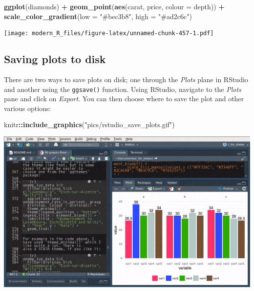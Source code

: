 \documentclass[]{gitbook}
\newenvironment{Shaded}{\begin{snugshade}}{\end{snugshade}}
\newcommand{\DataTypeTok}[1]{\textcolor[rgb]{0.13,0.29,0.53}{#1}}
\newcommand{\KeywordTok}[1]{\textcolor[rgb]{0.13,0.29,0.53}{\textbf{#1}}}
\newcommand{\NormalTok}[1]{#1}
\newcommand{\OperatorTok}[1]{\textcolor[rgb]{0.81,0.36,0.00}{\textbf{#1}}}
\newcommand{\StringTok}[1]{\textcolor[rgb]{0.31,0.60,0.02}{#1}}
\begin{document}
\begin{Shaded}
\begin{Highlighting}[]
\KeywordTok{ggplot}\NormalTok{(diamonds) }\OperatorTok{+}
\StringTok{  }\KeywordTok{geom_point}\NormalTok{(}\KeywordTok{aes}\NormalTok{(carat, price, }\DataTypeTok{colour =}\NormalTok{ depth)) }\OperatorTok{+}
\StringTok{  }\KeywordTok{scale_color_gradient}\NormalTok{(}\DataTypeTok{low =} \StringTok{"#bec3b8"}\NormalTok{, }\DataTypeTok{high =} \StringTok{"#ad2c6c"}\NormalTok{)}
\end{Highlighting}
\end{Shaded}

\texttt{[image: modern\_R\_files/figure-latex/unnamed-chunk-457-1.pdf]}

\hypertarget{saving-plots-to-disk}{%
\subsection{Saving plots to disk}\label{saving-plots-to-disk}}

There are two ways to save plots on disk; one through the \emph{Plots} plane in RStudio and another using the
\texttt{ggsave()} function. Using RStudio, navigate to the \emph{Plots} pane and click on \emph{Export}. You can
then choose where to save the plot and other various options:

\begin{Shaded}
\begin{Highlighting}[]
\NormalTok{knitr}\OperatorTok{::}\KeywordTok{include_graphics}\NormalTok{(}\StringTok{"pics/rstudio_save_plots.gif"}\NormalTok{)}
\end{Highlighting}
\end{Shaded}

\includegraphics{pics/rstudio_save_plots.gif}
\end{document}
